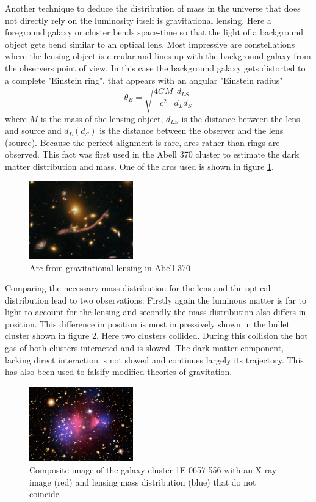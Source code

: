 Another technique to deduce the distribution of mass in the universe that does not directly rely on the luminosity itself is gravitational lensing. Here a foreground galaxy or cluster bends space-time so that the light of a background object gets bend similar to an optical lens. Most impressive are constellations where the lensing object is circular and lines up with the background galaxy from the observers point of view. In this case the background galaxy gets distorted to a complete "Einstein ring", that appears with an angular "Einstein radius" 
\begin{equation}
\theta_E = \sqrt{\frac{4GM}{c^2}\frac{d_{LS}}{d_Ld_S}}
\end{equation}
where $M$ is the mass of the lensing object, $d_{LS}$ is the distance between the lens and source and $d_L (d_S)$ is the distance between the observer and the lens (source). Because the perfect alignment is rare, arcs rather than rings are observed. 
This fact was first used in the Abell 370 cluster to estimate the dark matter distribution and mass. One of the arcs used is shown in figure \ref{fg:abell}. 
\begin{figure}[ht]
  \centering
    \includegraphics[width=0.4\textwidth]{imgs/large_web}
    \caption{Arc from gravitational lensing in Abell 370}
    \label{fg:abell}
\end{figure}
Comparing the necessary mass distribution for the lens and the optical distribution lead to two observations: Firstly again the luminous matter is far to light to account for the lensing and secondly the mass distribution also differs in position. 
This difference in position is most impressively shown in the bullet cluster shown in figure \ref{fg:bullet}. Here two clusters collided. During this collision the hot gas of both clusters interacted and is slowed. The dark matter component, lacking direct interaction is not slowed and continues largely its trajectory. This has also been used to falsify modified theories of gravitation. 
\begin{figure}[H]
  \centering
    \includegraphics[width=0.4\textwidth]{imgs/bullet}
    \caption{Composite image of the galaxy cluster 1E 0657-556 with an X-ray image (red) and lensing mass distribution (blue) that do not coincide \cite{Massey:2010hh}}
    \label{fg:bullet}
\end{figure}

